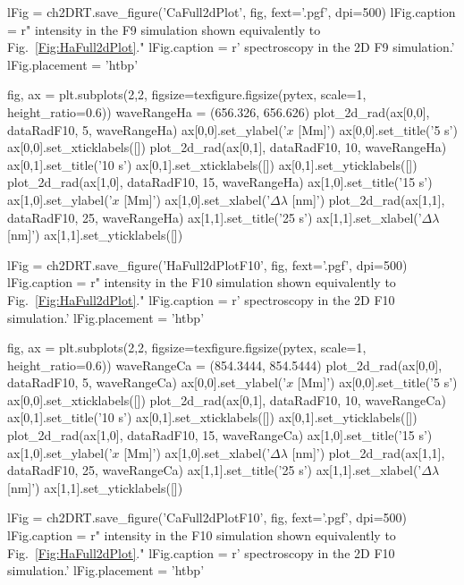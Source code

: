 \begin{pycode}[2DRT]
lFig = ch2DRT.save_figure('CaFull2dPlot', fig, fext='.pgf', dpi=500)
lFig.caption = r"\CaLine{} intensity in the F9 simulation shown equivalently to Fig.~\ref{Fig:HaFull2dPlot}."
lFig.caption = r'\CaLine{} spectroscopy in the 2D F9 simulation.'
lFig.placement = 'htbp'

fig, ax = plt.subplots(2,2, figsize=texfigure.figsize(pytex, scale=1, height_ratio=0.6))
waveRangeHa = (656.326, 656.626)
plot_2d_rad(ax[0,0], dataRadF10, 5, waveRangeHa)
ax[0,0].set_ylabel('$x$ [Mm]')
ax[0,0].set_title('5 s')
ax[0,0].set_xticklabels([])
plot_2d_rad(ax[0,1], dataRadF10, 10, waveRangeHa)
ax[0,1].set_title('10 s')
ax[0,1].set_xticklabels([])
ax[0,1].set_yticklabels([])
plot_2d_rad(ax[1,0], dataRadF10, 15, waveRangeHa)
ax[1,0].set_title('15 s')
ax[1,0].set_ylabel('$x$ [Mm]')
ax[1,0].set_xlabel('$\Delta\lambda$ [nm]')
plot_2d_rad(ax[1,1], dataRadF10, 25, waveRangeHa)
ax[1,1].set_title('25 s')
ax[1,1].set_xlabel('$\Delta\lambda$ [nm]')
ax[1,1].set_yticklabels([])

lFig = ch2DRT.save_figure('HaFull2dPlotF10', fig, fext='.pgf', dpi=500)
lFig.caption = r"\Ha{} intensity in the F10 simulation shown equivalently to Fig.~\ref{Fig:HaFull2dPlot}."
lFig.caption = r'\Ha{} spectroscopy in the 2D F10 simulation.'
lFig.placement = 'htbp'

fig, ax = plt.subplots(2,2, figsize=texfigure.figsize(pytex, scale=1, height_ratio=0.6))
waveRangeCa = (854.3444, 854.5444)
plot_2d_rad(ax[0,0], dataRadF10, 5, waveRangeCa)
ax[0,0].set_ylabel('$x$ [Mm]')
ax[0,0].set_title('5 s')
ax[0,0].set_xticklabels([])
plot_2d_rad(ax[0,1], dataRadF10, 10, waveRangeCa)
ax[0,1].set_title('10 s')
ax[0,1].set_xticklabels([])
ax[0,1].set_yticklabels([])
plot_2d_rad(ax[1,0], dataRadF10, 15, waveRangeCa)
ax[1,0].set_title('15 s')
ax[1,0].set_ylabel('$x$ [Mm]')
ax[1,0].set_xlabel('$\Delta\lambda$ [nm]')
plot_2d_rad(ax[1,1], dataRadF10, 25, waveRangeCa)
ax[1,1].set_title('25 s')
ax[1,1].set_xlabel('$\Delta\lambda$ [nm]')
ax[1,1].set_yticklabels([])

lFig = ch2DRT.save_figure('CaFull2dPlotF10', fig, fext='.pgf', dpi=500)
lFig.caption = r"\CaLine{} intensity in the F10 simulation shown equivalently to Fig.~\ref{Fig:HaFull2dPlot}."
lFig.caption = r'\CaLine{} spectroscopy in the 2D F10 simulation.'
lFig.placement = 'htbp'
\end{pycode}

